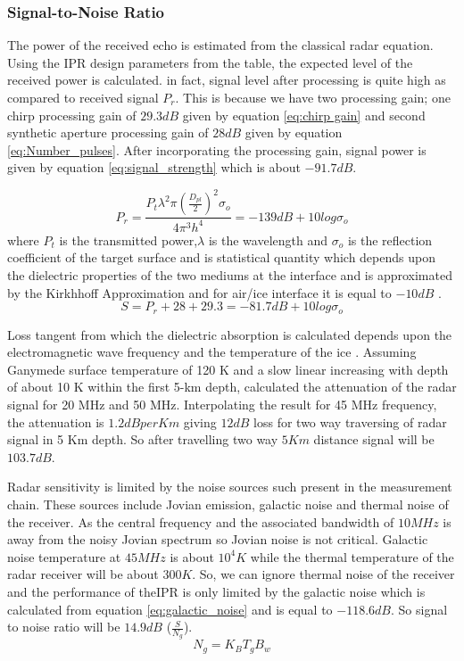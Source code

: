 \subsubsection{Signal-to-Noise Ratio}

The power of the received echo is estimated from the classical radar equation. Using the \ac{IPR} design parameters from the table, the expected level of the received power is calculated. in fact, signal level after processing is quite high as compared to received signal $P_{r}$. This is because we have two processing gain; one chirp processing gain of $29.3 dB$ given by equation \ref{eq:chirp gain} and second synthetic aperture processing gain of $28 dB$ given by equation \ref{eq:Number_pulses}. After incorporating the processing gain, signal power is given by equation \ref{eq:signal_strength} which is about $-91.7 dB$.

\begin{equation}
P_{r} = \dfrac{P_{t}\lambda^{2}\pi(\frac{D_{pl}}{2})^{2}\sigma_{o}}{4\pi^{3}h^{4}} 
	  = -139 dB + 10 log \sigma_{o}
\end{equation}
where $P_{t}$ is the transmitted power,$\lambda$ is the wavelength  and $\sigma_{o}$ is the reflection coefficient of the target surface and is statistical quantity which depends upon the dielectric properties of the two mediums at the interface and is approximated by the Kirkhhoff Approximation  and for air/ice interface it is equal to $-10dB$ \cite{MIMOSA}.
\begin{equation}
S = P_{r} + 28 +29.3
  = -81.7 dB + 10 log \sigma_{o}
\label{eq:signal_strength}
\end{equation}

Loss tangent from which the dielectric absorption is calculated depends upon the electromagnetic wave frequency and the temperature of the ice \cite{MIMOSA}. Assuming Ganymede surface temperature of 120 K and a slow linear increasing with depth of about 10 K within the first 5-km depth, \cite{Gany_SRS} calculated the attenuation of the radar signal for 20 MHz and 50 MHz. Interpolating the result for 45 MHz frequency, the attenuation is $1.2 dB per Km$ giving $12 dB$ loss for two way traversing of radar signal in 5 Km depth. So after travelling two way $5 Km $ distance signal will be $103.7 dB$.

Radar sensitivity is limited by the noise sources such present in the measurement chain. These sources include Jovian emission, galactic noise and thermal noise of the receiver.  As the central frequency and the associated bandwidth of $10 MHz$ is away from the noisy Jovian spectrum so Jovian noise is not critical. Galactic noise temperature at $45 MHz$ is about $10^{4}K$ while the thermal temperature of the radar receiver will be about  $300 K$. So, we can ignore thermal noise of the receiver and the performance of the\ac{IPR} is only limited by the galactic noise which is calculated from equation \ref{eq:galactic_noise} and is equal to $-118.6 dB$. So signal to noise ratio will be $14.9 dB$ ($\frac{S}{N_{g}}$).
\begin{equation}
N_{g} = K_{B}T_{g}B_{w}
\label{eq:galactic_noise}
\end{equation}
\\


